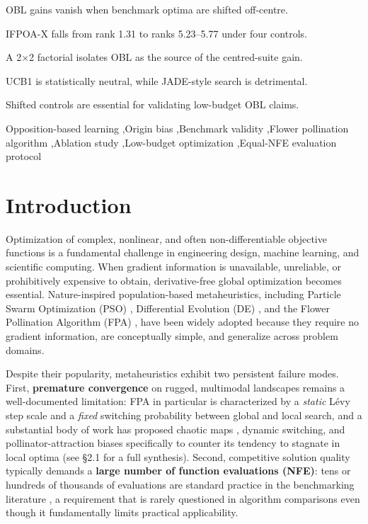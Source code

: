 \documentclass[preprint,12pt]{elsarticle}
\begin{document}
\begin{frontmatter}
\begin{highlights}
\item OBL gains vanish when benchmark optima are shifted off-centre.
\item IFPOA-X falls from rank 1.31 to ranks 5.23--5.77 under four controls.
\item A 2$\times$2 factorial isolates OBL as the source of the centred-suite gain.
\item UCB1 is statistically neutral, while JADE-style search is detrimental.
\item Shifted controls are essential for validating low-budget OBL claims.
\end{highlights}

\begin{keyword}
Opposition-based learning \sep Origin bias \sep Benchmark validity \sep Flower pollination algorithm \sep Ablation study \sep Low-budget optimization \sep Equal-NFE evaluation protocol

\end{keyword}

\end{frontmatter}

\section{Introduction}
\label{sec1}

Optimization of complex, nonlinear, and often non-differentiable objective functions is a fundamental challenge in engineering design, machine learning, and scientific computing. When gradient information is unavailable, unreliable, or prohibitively expensive to obtain, derivative-free global optimization becomes essential. Nature-inspired population-based metaheuristics, including Particle Swarm Optimization (PSO) \cite{kennedy1995particle}, Differential Evolution (DE) \cite{storn1997differential}, and the Flower Pollination Algorithm (FPA) \cite{yang2012flower}, have been widely adopted because they require no gradient information, are conceptually simple, and generalize across problem domains.

Despite their popularity, metaheuristics exhibit two persistent failure modes. First, \textbf{premature convergence} on rugged, multimodal landscapes remains a well-documented limitation: FPA in particular is characterized by a \emph{static} L\'evy step scale and a \emph{fixed} switching probability between global and local search, and a substantial body of work has proposed chaotic maps \cite{arora2017chaos}, dynamic switching, and pollinator-attraction biases \cite{mergos2022flower} specifically to counter its tendency to stagnate in local optima (see \S2.1 for a full synthesis). Second, competitive solution quality typically demands a \textbf{large number of function evaluations (NFE)}: tens or hundreds of thousands of evaluations are standard practice in the benchmarking literature \cite{yao1999evolutionary}, a requirement that is rarely questioned in algorithm comparisons even though it fundamentally limits practical applicability.
\end{document}
